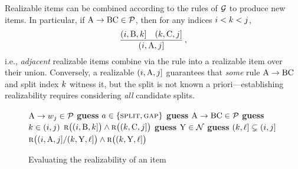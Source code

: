 \documentclass{article}
\begin{document}
Realizable items can be combined according to the rules of ${{ \mathcal{G}}}$ to produce new items. 
In particular, if ${{ {{ \mathrm{A}}} \rightarrow {{ \mathrm{B}}} {{ \mathrm{C}}}}} \in {{ \mathcal{P}}}$, then for any indices ${{ i}} < {{ k}} < {{ j}}$,
\begin{equation*}
    \dfrac{({{ i}}, {{ \mathrm{B}}}, {{ k}}] \quad ({{ k}}, {{ \mathrm{C}}}, {{ j}}]}{({{ i}}, {{ \mathrm{A}}}, {{ j}}]}\,,
\end{equation*}
i.e., \emph{adjacent} realizable items combine via the rule into a realizable item over their union. 
Conversely, a realizable $({{ i}}, {{ \mathrm{A}}}, {{ j}}]$ guarantees that \emph{some} rule ${{ {{ \mathrm{A}}} \rightarrow {{ \mathrm{B}}} {{ \mathrm{C}}}}}$ and split index ${{ k}}$ witness it, but the split is not known a priori---establishing realizability requires considering \emph{all} candidate splits.

\begin{figure}
    \begin{algorithm}[H]
    \algrenewcommand{}\footnotesize
        \algrenewcommand\algorithmicindent{1.0em}
        \caption{Evaluating the realizability of an item}
        \label{alg1}
        \begin{algorithmic}[1]
            \Function{\recAlgo}{$(\idxi, \NT{A}, \idxj]$}
            \State \Return ${{ {{ \mathrm{A}}} \rightarrow {w}_{{ j}}}} \in {{ \mathcal{P}}}$
            \Else
            \State \textbf{guess} $a \in \{\textsc{split}, \textsc{gap}\}$
            \State \textbf{guess} ${{ {{ \mathrm{A}}} \rightarrow {{ \mathrm{B}}}{{ \mathrm{C}}}}} \in {{ \mathcal{P}}}$
            \State \textbf{guess} ${{ k}} \in ({{ i}}, {{ j}})$
            \State \Return ${\textsc{r}}\bigl(({{ i}}, {{ \mathrm{B}}}, {{ k}}]\bigr) \wedge {\textsc{r}}\bigl(({{ k}}, {{ \mathrm{C}}}, {{ j}}]\bigr)$
            \Else
            \State \textbf{guess} ${{ \mathrm{Y}}} \in {{ \mathcal{N}}}$
            \State \textbf{guess} $({{ k}}, {{\ell}}] \subsetneq ({{ i}}, {{ j}}]$
            \State \Return ${\textsc{r}}\bigl(({{ i}}, {{ \mathrm{A}}}, {{ j}}] / ({{ k}}, {{ \mathrm{Y}}}, {{\ell}}]\bigr) \wedge {\textsc{r}}\bigl(({{ k}}, {{ \mathrm{Y}}}, {{\ell}}]\bigr)$
            \EndIf
            \EndIf
            \EndFunction
        \end{algorithmic}
    \end{algorithm}
\end{figure}
\end{document}
